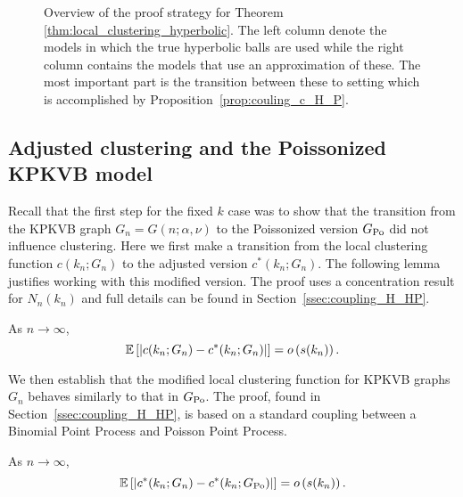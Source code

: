 \begin{figure}[!t]

\caption{Overview of the proof strategy for Theorem \ref{thm:local_clustering_hyperbolic}. The left column denote the models in which the true hyperbolic balls are used while the right column contains the models that use an approximation of these. The most important part is the transition between these to setting which is accomplished by Proposition~\ref{prop:couling_c_H_P}.}
\label{fig:overview_proof}
\end{figure}


\subsection{Adjusted clustering and the Poissonized KPKVB model}\label{ssec:KPKVB_to_GPo_infinite_k}

Recall that the first step for the fixed $k$ case was to show that the transition from the KPKVB graph $G_n = G(n;\alpha,\nu)$ to the Poissonized version $G_{{\mathrm{Po}}}$ did not influence clustering. Here we first make a transition from the local clustering function $c(k_n; G_n)$ to the adjusted version $c^\ast(k_n; G_n)$. The following lemma justifies working with this modified version. The proof uses a concentration result for $N_{n}(k_n)$ and full details can be found in Section~\ref{ssec:coupling_H_HP}.

\begin{lemma}\label{lem:clustering_ast_H}
As $n \to \infty$,
\[
	\mathbb{E}\left[\left|c(k_n;G_n) - c^\ast(k_n;G_n)\right|\right] = o\left(s(k_n)\right).
\]
\end{lemma}

We then establish that the modified local clustering function for KPKVB graphs $G_n$ behaves similarly to that in $G_{{\mathrm{Po}}}$. The proof, found in Section~\ref{ssec:coupling_H_HP}, is based on a standard coupling between a Binomial Point Process and Poisson Point Process.

\begin{proposition}\label{prop:clustering_ast_H_Pois}
As $n \to \infty$,
\[
	\mathbb{E}\left[\left|c^\ast(k_n;G_n) - c^\ast(k_n; G_{{\mathrm{Po}}})\right|\right] = o\left(s(k_n)\right).
\]
\end{proposition}

